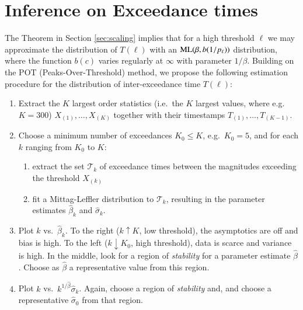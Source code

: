 \documentclass[]{elsarticle} %
\providecommand{\tightlist}{%
  \setlength{\itemsep}{0pt}\setlength{\parskip}{0pt}}
\begin{document}
\hypertarget{inference-on-exceedance-times}{%
\section{Inference on Exceedance
times}\label{inference-on-exceedance-times}}

The Theorem in Section \ref{sec:scaling} implies that for a high
threshold \(\ell\) we may approximate the distribution of \(T(\ell)\)
with an \({\rm ML}(\beta, b(1/p_{\ell}))\) distribution, where the
function \(b(c)\) varies regularly at \(\infty\) with parameter
\(1/\beta\). Building on the POT (Peaks-Over-Threshold) method, we
propose the following estimation procedure for the distribution of
inter-exceedance time \(T(\ell)\):

\begin{enumerate}
\def\labelenumi{\arabic{enumi}.}
\item
  Extract the \(K\) largest order statistics (i.e.~the \(K\) largest
  values, where e.g.~\(K = 300\)) \(X_{(1)}, \ldots, X_{(K)}\) together
  with their timestamps \(T_{(1)}, \ldots, T_{(K-1)}\).
\item
  Choose a minimum number of exceedances \(K_0\leq K\),
  e.g.~\(K_0 = 5\), and for each \(k\) ranging from \(K_0\) to \(K\):

  \begin{enumerate}
  \def\labelenumii{\alph{enumii})}
  \tightlist
  \item
    extract the set \(\mathcal T_k\) of exceedance times between the
    magnitudes exceeding the threshold \(X_{(k)}\)
  \item
    fit a Mittag-Leffler distribution to \(\mathcal T_k\), resulting in
    the parameter estimates \(\hat\beta_k\) and \(\hat \sigma_k\).
  \end{enumerate}
\item
  Plot \(k\) vs.~\(\hat \beta_k\). To the right (\(k \uparrow K\), low
  threshold), the asymptotics are off and bias is high. To the left
  (\(k \downarrow K_0\), high threshold), data is scarce and variance is
  high. In the middle, look for a region of \emph{stability} for a
  parameter estimate \(\hat \beta\). Choose as \(\hat \beta\) a
  representative value from this region.
\item
  Plot \(k\) vs.~\(k^{1/\hat \beta} \hat \sigma_k\). Again, choose a
  region of \emph{stability} and, and choose a representative
  \(\hat \sigma_0\) from that region.
\end{enumerate}
\end{document}
